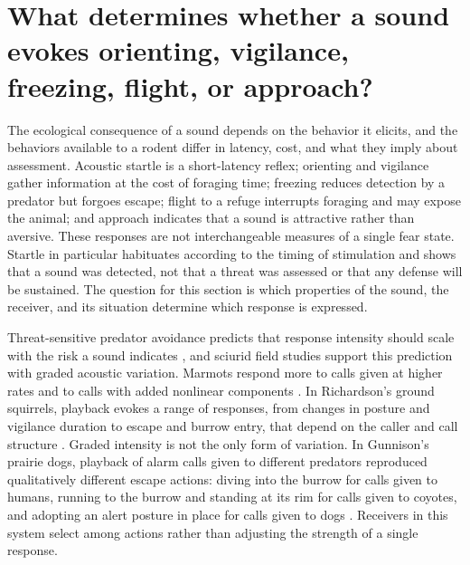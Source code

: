 \section{What determines whether a sound evokes orienting, vigilance, freezing, flight, or approach?}
\label{sec:q4}


The ecological consequence of a sound depends on the behavior it elicits, and the behaviors available to a rodent differ in latency, cost, and what they imply about assessment. Acoustic startle is a short-latency reflex; orienting and vigilance gather information at the cost of foraging time; freezing reduces detection by a predator but forgoes escape; flight to a refuge interrupts foraging and may expose the animal; and approach indicates that a sound is attractive rather than aversive. These responses are not interchangeable measures of a single fear state. Startle in particular habituates according to the timing of stimulation \citep{Davis1970} and shows that a sound was detected, not that a threat was assessed or that any defense will be sustained. The question for this section is which properties of the sound, the receiver, and its situation determine which response is expressed.

Threat-sensitive predator avoidance predicts that response intensity should scale with the risk a sound indicates \citep{Helfman1989}, and sciurid field studies support this prediction with graded acoustic variation. Marmots respond more to calls given at higher rates \citep{BlumsteinArmitage1997} and to calls with added nonlinear components \citep{BlumsteinRecapet2009}.
In Richardson's ground squirrels, playback evokes a range of responses, from changes in posture and vigilance duration to escape and burrow entry, that depend on the caller and call structure \citep{Hare1998}. Graded intensity is not the only form of variation. In Gunnison's prairie dogs, playback of alarm calls given to different predators reproduced qualitatively different escape actions: diving into the burrow for calls given to humans, running to the burrow and standing at its rim for calls given to coyotes, and adopting an alert posture in place for calls given to dogs \citep{KiriazisSlobodchikoff2006}. Receivers in this system select among actions rather than adjusting the strength of a single response.

